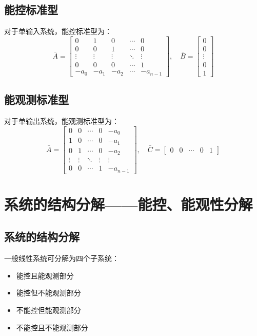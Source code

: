 \documentclass[12pt,a4paper]{article}
\begin{document}
\subsection{能控标准型}
对于单输入系统，能控标准型为：
\[\bar{A} = \begin{bmatrix}
0 & 1 & 0 & \cdots & 0 \\
0 & 0 & 1 & \cdots & 0 \\
\vdots & \vdots & \vdots & \ddots & \vdots \\
0 & 0 & 0 & \cdots & 1 \\
-a_0 & -a_1 & -a_2 & \cdots & -a_{n-1}
\end{bmatrix}, \quad \bar{B} = \begin{bmatrix} 0 \\ 0 \\ \vdots \\ 0 \\ 1 \end{bmatrix}\]

\subsection{能观测标准型}
对于单输出系统，能观测标准型为：
\[\bar{A} = \begin{bmatrix}
0 & 0 & \cdots & 0 & -a_0 \\
1 & 0 & \cdots & 0 & -a_1 \\
0 & 1 & \cdots & 0 & -a_2 \\
\vdots & \vdots & \ddots & \vdots & \vdots \\
0 & 0 & \cdots & 1 & -a_{n-1}
\end{bmatrix}, \quad \bar{C} = \begin{bmatrix} 0 & 0 & \cdots & 0 & 1 \end{bmatrix}\]

\section{系统的结构分解——能控、能观性分解}

\subsection{系统的结构分解}
一般线性系统可分解为四个子系统：
\begin{itemize}
    \item 能控且能观测部分
    \item 能控但不能观测部分
    \item 不能控但能观测部分
    \item 不能控且不能观测部分
\end{itemize}
\end{document}
